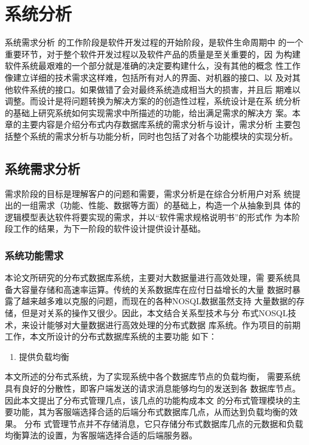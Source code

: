 
\chapter{系统分析}
系统需求分析
的工作阶段是软件开发过程的开始阶段，是软件生命周期中
的一个重要环节，对于整个软件开发过程以及软件产品的质量是至关重要的，因
为构建软件系统最艰难的一个部分就是准确的决定要构建什么，没有其他的概念
性工作像建立详细的技术需求这样难，包括所有对人的界面、对机器的接口、以
及对其他软件系统的接口。如果做错了会对最终系统造成相当大的损害，并且后
期难以调整。而设计是将问题转换为解决方案的的创造性过程，系统设计是在系
统分析的基础上研究系统如何实现需求中所描述的功能，给出满足需求的解决方
案。本章的主要内容是介绍分布式内存数据库系统的需求分析与设计，需求分析
主要包括整个系统的需求分析与功能分析，同时也包括了对各个功能模块的实现分析。
\section{系统需求分析}
需求阶段的目标是理解客户的问题和需要，需求分析是在综合分析用户对系
统提出的一组需求（功能、性能、数据等方面）的基础上，构造一个从抽象到具
体的逻辑模型表达软件将要实现的需求，并以“软件需求规格说明书”的形式作
为本阶段工作的结果，为下一阶段的软件设计提供设计基础。
\subsection{系统功能需求}
本论文所研究的分布式数据库系统，主要对大数据量进行高效处理，需
要系统具备大容量存储和高速率运算。传统的关系数据库在应付日益增长的大量
数据时暴露了越来越多难以克服的问题，而现在的各种NOSQL数据虽然支持
大量数据的存储，但是对关系的操作又很少。因此，本文结合关系型技术与分
布式NOSQL技术，来设计能够对大量数据进行高效处理的分布式数据
库系统。作为项目的前期工作，本文所设计的分布式数据库系统的主要功能
如下：


	\begin{enumerate}
		\item 提供负载均衡
	\end{enumerate}

	本文所述的分布式系统，为了实现系统中各个数据库节点的负载均衡，
	需要系统具有良好的分散性，即客户端发送的请求消息能够均匀的发送到各
	数据库节点。因此本文提出了分布式管理几点，该几点的功能构成本文
	的分布式管理模块的主要功能，其为客服端选择合适的后端分布式数据库几点，从而达到负载均衡的效果。
	分布
	式管理节点并不存储消息，它只存储分布式数据库几点的元数据和负载均衡算法的设置，为客服端选择合适的后端服务器。
	
